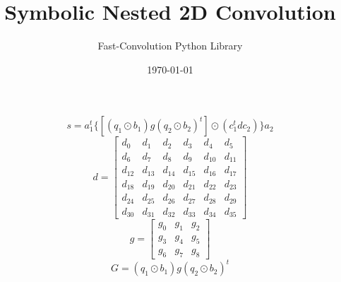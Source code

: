 \documentclass{article}%
\title{Symbolic Nested 2D Convolution}%
\author{Fast{-}Convolution Python Library}%
\date{\today}%
\begin{document}
%
\normalsize%
\maketitle%
\[%
s=a_1^t \{[(q_1 \odot b_1) g (q_2 \odot b_2)^t] \odot (c_1^t d c_2)\}a_2%
\]%
\[%
d = \left[\begin{matrix}d_{0} & d_{1} & d_{2} & d_{3} & d_{4} & d_{5}\\d_{6} & d_{7} & d_{8} & d_{9} & d_{10} & d_{11}\\d_{12} & d_{13} & d_{14} & d_{15} & d_{16} & d_{17}\\d_{18} & d_{19} & d_{20} & d_{21} & d_{22} & d_{23}\\d_{24} & d_{25} & d_{26} & d_{27} & d_{28} & d_{29}\\d_{30} & d_{31} & d_{32} & d_{33} & d_{34} & d_{35}\end{matrix}\right]%
\]%
\[%
g = \left[\begin{matrix}g_{0} & g_{1} & g_{2}\\g_{3} & g_{4} & g_{5}\\g_{6} & g_{7} & g_{8}\end{matrix}\right]%
\]%
\[%
G = (q_1 \odot b_1) g (q_2 \odot b_2)^t%
\]%
\end{document}
